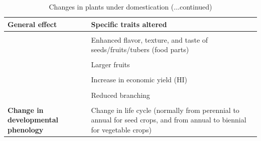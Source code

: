 \documentclass[
  ignorenonframetext,
  aspectratio=169]{beamer}
\begin{document}
\begin{frame}{}
\protect\hypertarget{section-7}{}
\begin{table}

\caption{\label{tab:domestication-syndrome2}Changes in plants under domestication (...continued)}
\centering
\fontsize{6}{8}\selectfont
\begin{tabular}[t]{>{\raggedright\arraybackslash}p{16em}>{\raggedright\arraybackslash}p{40em}}
\toprule
General effect & Specific traits altered\\
\midrule
\textbf{\cellcolor{gray!6}{Increased appeal to consumers}} & \cellcolor{gray!6}{Attractive fruit/seed colors and patterns}\\
\textbf{} & Enhanced flavor, texture, and taste of seeds/fruits/tubers (food parts)\\
\textbf{\cellcolor{gray!6}{}} & \cellcolor{gray!6}{Reduced toxic principles (safer food)}\\
\textbf{} & Larger fruits\\
\textbf{\cellcolor{gray!6}{}} & \cellcolor{gray!6}{Reduces spikiness}\\
\addlinespace
\textbf{} & Increase in economic yield (HI)\\
\textbf{\cellcolor{gray!6}{Altered plant architecture and growth habit}} & \cellcolor{gray!6}{Compact growth habit (Determinacy, reduced plant size, dwarfism)}\\
\textbf{} & Reduced branching\\
\textbf{\cellcolor{gray!6}{}} & \cellcolor{gray!6}{Decreases in variability within a variety}\\
\textbf{Change in developmental phenology} & Change in life cycle (normally from perennial to annual for seed crops, and from annual to biennial for vegetable crops)\\
\bottomrule
\end{tabular}
\end{table}
\end{frame}
\end{document}
